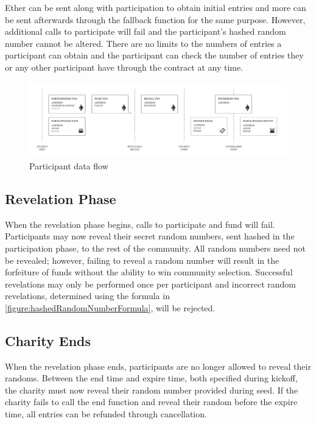 \documentclass[11pt]{article}
\begin{document}
Ether can be sent along with participation to obtain initial entries and more can be sent afterwards through the fallback function for the same purpose. However, additional calls to participate will fail and the participant's hashed random number cannot be altered. There are no limits to the numbers of entries a participant can obtain and the participant can check the number of entries they or any other participant have through the contract at any time.

\begin{figure}[H]
\begin{center}
\includegraphics[width=1.0\textwidth]{participantDataFlow.pdf}
\caption{Participant data flow}
\label{figure:participantDataFlow}
\end{center}
\end{figure}

\subsection{Revelation Phase}

When the revelation phase begins, calls to participate and fund will fail. Participants may now reveal their secret random numbers, sent hashed in the participation phase, to the rest of the community. All random numbers need not be revealed; however, failing to reveal a random number will result in the forfeiture of funds without the ability to win community selection. Successful revelations may only be performed once per participant and incorrect random revelations, determined using the formula in \ref{figure:hashedRandomNumberFormula}, will be rejected.

\subsection{Charity Ends}

When the revelation phase ends, participants are no longer allowed to reveal their randoms. Between the end time and expire time, both specified during kickoff, the charity must now reveal their random number provided during seed. If the charity fails to call the end function and reveal their random before the expire time, all entries can be refunded through cancellation.
\end{document}
